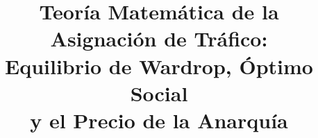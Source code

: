 \documentclass{book}
\title{Teoría Matemática de la Asignación de Tráfico:\\
Equilibrio de Wardrop, Óptimo Social\\
y el Precio de la Anarquía}
\author{}
\newcommand\cvsnote{}
\renewcommand{\listoftodos}{}
\newcommand\cvsnote{}
\renewcommand{\listoftodos}{}
\newcommand\cvsnote{}
\theoremstyle{plain}
\theoremstyle{definition}
\theoremstyle{remark}
\begin{document}
\cvsnote
\pagestyle{fancy}

\newcommand\fileDate{2026}
\newcommand\fileName{trafico.tex}

\newcommand{\includefile}[2]{%
   \renewcommand{\fileName}{#1}
   \renewcommand{\fileDate}{#2}
   
}

\cleardoublepage
\tableofcontents
\listoftodos

\includefile{capitulo01}{2026}   %
\includefile{capitulo02}{2026}   %
\includefile{capitulo03}{2026}   %
\includefile{capitulo04}{2026}   %
\includefile{capitulo05}{2026}   %
\includefile{capitulo06}{2026}   %

\cleardoublepage
\thispagestyle{empty}

{}



{}
\printindex
\end{document}
